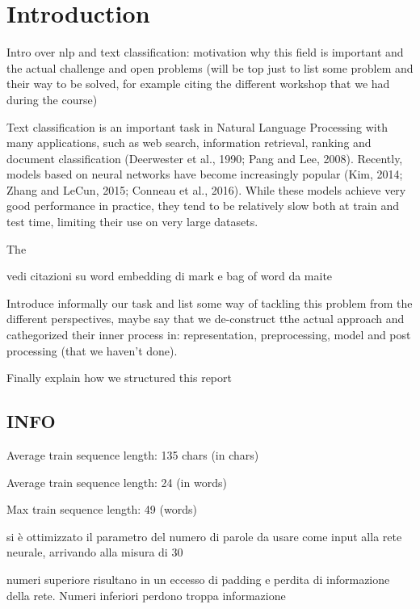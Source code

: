 \section{Introduction} \label{sec:introduction}

Intro over nlp and text classification: motivation why this field is important and the actual challenge and open problems (will be top just to list some problem and their way to be solved, for example citing the different workshop that we had during the course)


Text classification is an important task in Natural Language Processing with many applications, such as web search, information retrieval, ranking and document classification (Deerwester et al., 1990; Pang and Lee, 2008). Recently, models based on neural networks have become increasingly popular (Kim, 2014; Zhang and LeCun, 2015; Conneau et al., 2016). While these models achieve very good performance in practice, they tend to be relatively slow both at train and test time, limiting their use on very large datasets.

The 

vedi citazioni su word embedding di mark e bag of word da maite

Introduce informally our task and list some way of tackling this problem from the different perspectives, maybe say that we de-construct tthe actual approach and cathegorized their inner process in: representation, preprocessing, model and post processing (that we haven't done).

Finally explain how we structured this report

\subsection{INFO}

Average train sequence length: 135 chars (in chars)

Average train sequence length: 24 (in words)

Max train sequence length: 49 (words)

si è ottimizzato il parametro del numero di parole da usare come input alla rete neurale, arrivando alla misura di 30

numeri superiore risultano in un eccesso di padding e perdita di informazione della rete. Numeri inferiori perdono troppa informazione


